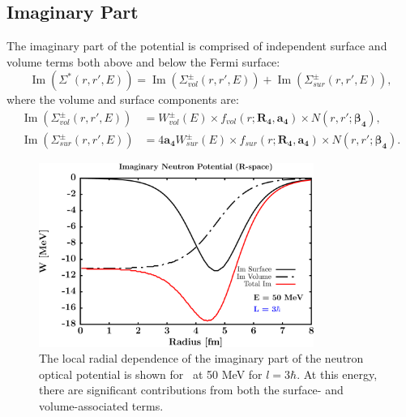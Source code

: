 \subsection{Imaginary Part}
The imaginary part of the potential is comprised of independent surface and volume terms
both above and below the Fermi surface:
\begin{equation}
    \operatorname{Im}({\Sigma^{*}(r,r',E)}) =
    \operatorname{Im}({\Sigma_{vol}^{\pm}(r,r',E)})
    + \operatorname{Im}({\Sigma_{sur}^{\pm}(r,r',E)}),
\end{equation}
where the volume and surface components are:
\begin{equation}
    \begin{split}
        \operatorname{Im}({\Sigma_{vol}^{\pm}(r,r',E)})
        & = W_{vol}^{\pm}(E){\times}f_{vol}(r; \bm{R_{4}}, \bm{a_{4}})
        {\times}N(r,r'; \bm{\beta_{4}}),\\
        \operatorname{Im}({\Sigma_{sur}^{\pm}(r,r',E)})
        & = 4\bm{a_{4}}W_{sur}^{\pm}(E){\times}f_{sur}(r; \bm{R_{4}}, \bm{a_{4}})
        {\times} N(r,r';\bm{\beta_{4}}).
    \end{split}
\end{equation}
\begin{figure}[tb]
    \centering
    \includegraphics[width=0.8\textwidth]{figures/ImPotentialRSpace.png}
    \caption[Radial dependence of the imaginary part of the potential]
    {
        The local radial dependence of the imaginary part of the neutron optical potential is shown
        for \niEight\ at 50 MeV for $l=3\hbar$. At this energy, there are
        significant contributions from both the surface- and volume-associated
        terms.
    }
    \label{ImaginaryRadialDependence}
\end{figure}
